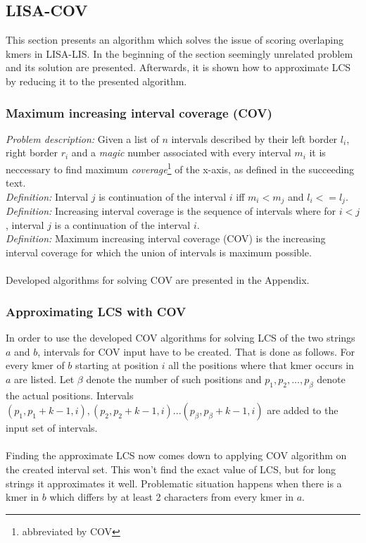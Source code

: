 \documentclass[times, utf8, diplomski]{fer}
\begin{document}
\subsection{LISA-COV}

This section presents an algorithm which solves the issue of scoring overlaping kmers in LISA-LIS. In the beginning of the section seemingly unrelated problem and its solution are presented. Afterwards, it is shown how to approximate LCS by reducing it to the presented algorithm.

\subsubsection{Maximum increasing interval coverage (COV)}

\emph{Problem description: } Given a list of $n$ intervals described by their left border $l_i$, right border $r_i$ and a \emph{magic} number associated with every interval $m_i$ it is neccessary to find maximum \emph{coverage}\footnote{abbreviated by COV} of the x-axis, as defined in the succeeding text.\\
\emph{Definition: } Interval $j$ is continuation of the interval $i$ iff $m_i<m_j$ and $l_i <= l_j$.\\
\emph{Definition: } Increasing interval coverage is the sequence of intervals where for $i<j$, interval $j$ is a continuation of the interval $i$.\\
\emph{Definition: } Maximum increasing interval coverage (COV) is the increasing interval coverage for which the union of intervals is maximum possible.\\
\\
Developed algorithms for solving COV are presented in the Appendix.

\subsubsection{Approximating LCS with COV}

In order to use the developed COV algorithms for solving LCS of the two strings $a$ and $b$, intervals for COV input have to be created. That is done as follows. For every kmer of $b$ starting at position $i$ all the positions where that kmer occurs in $a$ are listed. Let $\beta$ denote the number of such positions and $p_1,p_2,...,p_\beta$ denote the actual positions. Intervals $(p_1,p_1+k-1,i),(p_2,p_2+k-1,i)...(p_\beta, p_\beta+k-1,i)$ are added to the input set of intervals.\\
\\
Finding the approximate LCS now comes down to applying COV algorithm on the created interval set. This won't find the exact value of LCS, but for long strings it approximates it well. Problematic situation happens when there is a kmer in $b$ which differs by at least 2 characters from every kmer in $a$.
\end{document}
